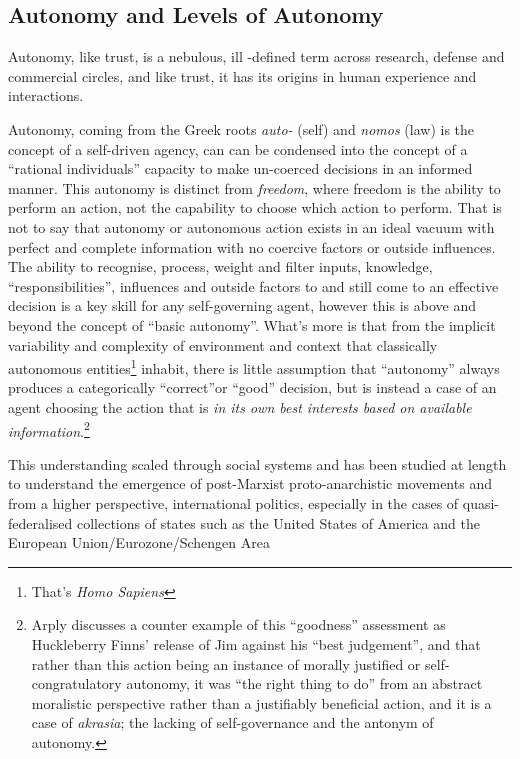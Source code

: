 \subsection{Autonomy and Levels of Autonomy}



Autonomy, like trust, is a nebulous, ill -defined term across research, defense and commercial circles, and like trust, it has its origins in human experience and interactions. 

Autonomy, coming from the Greek roots \textit{auto-} (self) and \textit{nomos} (law) is the concept of a self-driven agency, can can be condensed into the concept of a ``rational individuals'' capacity to make un-coerced decisions in an informed manner. 
This autonomy is distinct from \textit{freedom}, where freedom is the ability to perform an action, not the capability to choose which action to perform.
That is not to say that autonomy or autonomous action exists in an ideal vacuum with perfect and complete information with no coercive factors or outside influences.
The ability to recognise, process, weight and filter inputs, knowledge, ``responsibilities'', influences and outside factors to and still come to an effective decision is a key skill for any self-governing agent, however this is above and beyond the concept of ``basic autonomy''.
What's more is that from the implicit variability and complexity of environment and context that classically autonomous entities\footnote{That's \textit{Homo Sapiens}} inhabit, there is little assumption that ``autonomy'' always produces a categorically ``correct''or ``good'' decision, but is instead a case of an agent choosing the action that is \textit{in its own best interests based on available information}\cite{Arpaly2003}.\footnote{Arply discusses a counter example of this ``goodness'' assessment as  Huckleberry Finns' release of Jim against his ``best judgement'', and that rather than this action being an instance of morally justified or self-congratulatory autonomy, it was ``the right thing to do'' from an abstract moralistic perspective rather than a justifiably beneficial action, and it is a case of \textit{akrasia}; the lacking of self-governance and the antonym of autonomy.}

This understanding scaled through social systems and has been studied at length to understand the emergence of post-Marxist proto-anarchistic movements\cite{Hunter2016} and from a higher perspective, international politics, especially in the cases of quasi-federalised collections of states such as the United States of America\cite{Halberstam2001} and the European Union/Eurozone/Schengen Area  \cite{Richter2012}

